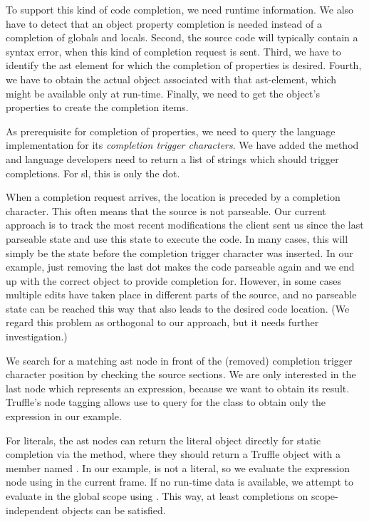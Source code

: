 \documentclass[sigplan,10pt,screen]{acmart}
\begin{document}
To support this kind of code completion, we need runtime information. We also
have to detect that an object property completion is needed instead of a
completion of globals and locals. Second, the source code will typically contain
a syntax error, when this kind of completion request is sent. Third, we have to
identify the \ac{ast} element for which the completion of properties is
desired. Fourth, we have to obtain the actual object associated with that
\ac{ast}-element, which might be available only at run-time. Finally, we need to
get the object's properties to create the completion items.

As prerequisite for completion of properties, we need to query the language
implementation for its \emph{completion trigger characters}. We have added the
method  and language developers need
to return a list of strings which should trigger completions. For \ac{sl}, this
is only the dot.

When a completion request arrives, the location is preceded by a completion
character. This often means that the source is not parseable. Our current
approach is to track the most recent modifications the client sent us since the
last parseable state and use this state to execute the code. In many cases, this
will simply be the state before the completion trigger character was
inserted. In our example, just removing the last dot makes the code parseable
again and we end up with the correct object to provide completion for. However,
in some cases multiple edits have taken place in different parts of the source,
and no parseable state can be reached this way that also leads to the desired
code location. (We regard this problem as orthogonal to our approach, but it
needs further investigation.)

We search for a matching \ac{ast} node in front of the (removed) completion
trigger character position by checking the source sections. We are only
interested in the last node which represents an expression, because we want to
obtain its result. Truffle's node tagging allows use to query for the
 class to obtain only the expression
 in our example.

For literals, the \ac{ast} nodes can return the literal object directly for
static completion via the  method, where they should
return a Truffle object with a member named . In our
example,  is not a literal, so we evaluate the expression
node using  in the current frame. If no run-time data is
available, we attempt to evaluate in the global scope using
. This way, at least completions on scope-independent objects
can be satisfied.
\end{document}
